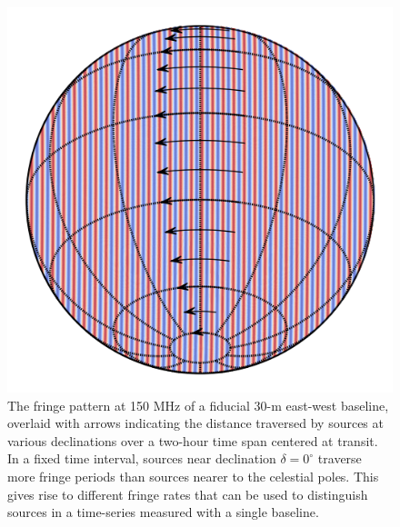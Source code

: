 \documentclass[twocolumn,apj,numberedappendix]{emulateapj}
\begin{document}
\begin{figure}\centering
\includegraphics[width=.9\columnwidth]{plots/ew_fringe.png}
\caption{
The fringe pattern at 150 MHz of a fiducial 30-m east-west baseline, overlaid with arrows indicating
the distance traversed by sources at various declinations over a two-hour time span centered at transit.
In a fixed time interval, sources near declination $\delta=0^\circ$ traverse more 
fringe periods than sources nearer to the celestial poles. This gives rise to different
fringe rates that can be used to distinguish sources in a time-series measured with a single baseline.
}\label{fig:ew_fringe}
\end{figure}
\end{document}
